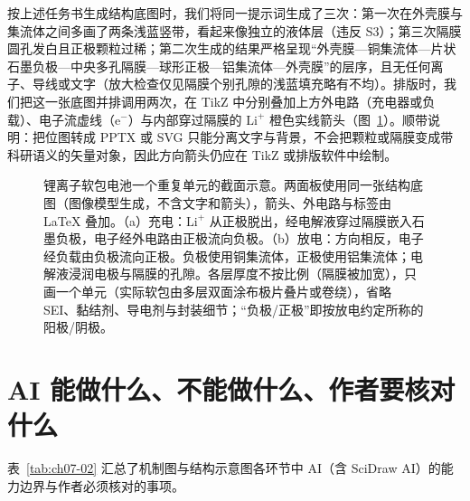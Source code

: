 按上述任务书生成结构底图时，我们将同一提示词生成了三次：第一次在外壳膜与集流体之间多画了两条浅蓝竖带，看起来像独立的液体层（违反 S3）；第三次隔膜圆孔发白且正极颗粒过稀；第二次生成的结果严格呈现“外壳膜—铜集流体—片状石墨负极—中央多孔隔膜—球形正极—铝集流体—外壳膜”的层序，且无任何离子、导线或文字（放大检查仅见隔膜个别孔隙的浅蓝填充略有不均）。排版时，我们把这一张底图并排调用两次，在 TikZ 中分别叠加上方外电路（充电器或负载）、电子流虚线（$\text{e}^-$）与内部穿过隔膜的 $\text{Li}^+$ 橙色实线箭头（图~\ref{fig:ch07-08}）。顺带说明：把位图转成 PPTX 或 SVG 只能分离文字与背景，不会把颗粒或隔膜变成带科研语义的矢量对象，因此方向箭头仍应在 TikZ 或排版软件中绘制。

\begin{figure}[htbp]\centering

\caption{锂离子软包电池一个重复单元的截面示意。两面板使用同一张结构底图（图像模型生成，不含文字和箭头），箭头、外电路与标签由 LaTeX 叠加。（a）充电：$\text{Li}^+$ 从正极脱出，经电解液穿过隔膜嵌入石墨负极，电子经外电路由正极流向负极。（b）放电：方向相反，电子经负载由负极流向正极。负极使用铜集流体，正极使用铝集流体；电解液浸润电极与隔膜的孔隙。各层厚度不按比例（隔膜被加宽），只画一个单元（实际软包由多层双面涂布极片叠片或卷绕），省略 SEI、黏结剂、导电剂与封装细节；“负极/正极”即按放电约定所称的阳极/阴极。}\label{fig:ch07-08}
\end{figure}

\section{AI 能做什么、不能做什么、作者要核对什么}

表~\ref{tab:ch07-02} 汇总了机制图与结构示意图各环节中 AI（含 SciDraw AI）的能力边界与作者必须核对的事项。

